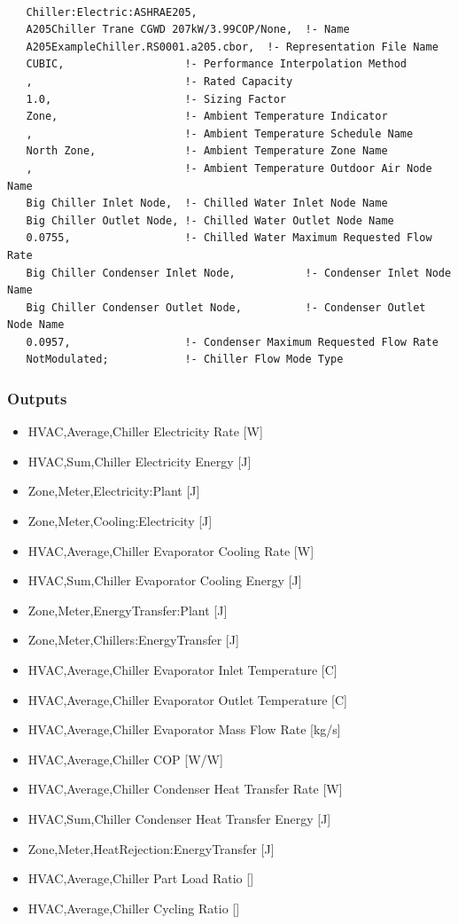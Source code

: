 \begin{lstlisting}

   Chiller:Electric:ASHRAE205,
   A205Chiller Trane CGWD 207kW/3.99COP/None,  !- Name
   A205ExampleChiller.RS0001.a205.cbor,  !- Representation File Name
   CUBIC,                   !- Performance Interpolation Method
   ,                        !- Rated Capacity
   1.0,                     !- Sizing Factor
   Zone,                    !- Ambient Temperature Indicator
   ,                        !- Ambient Temperature Schedule Name
   North Zone,              !- Ambient Temperature Zone Name
   ,                        !- Ambient Temperature Outdoor Air Node Name
   Big Chiller Inlet Node,  !- Chilled Water Inlet Node Name
   Big Chiller Outlet Node, !- Chilled Water Outlet Node Name
   0.0755,                  !- Chilled Water Maximum Requested Flow Rate
   Big Chiller Condenser Inlet Node,           !- Condenser Inlet Node Name
   Big Chiller Condenser Outlet Node,          !- Condenser Outlet Node Name
   0.0957,                  !- Condenser Maximum Requested Flow Rate
   NotModulated;            !- Chiller Flow Mode Type

\end{lstlisting}

\subsubsection{Outputs}

\begin{itemize}
    \item
    HVAC,Average,Chiller Electricity Rate {[}W{]}
    \item
    HVAC,Sum,Chiller Electricity Energy {[}J{]}
    \item
    Zone,Meter,Electricity:Plant {[}J{]}
    \item
    Zone,Meter,Cooling:Electricity {[}J{]}
    \item
    HVAC,Average,Chiller Evaporator Cooling Rate {[}W{]}
    \item
    HVAC,Sum,Chiller Evaporator Cooling Energy {[}J{]}
    \item
    Zone,Meter,EnergyTransfer:Plant {[}J{]}
    \item
    Zone,Meter,Chillers:EnergyTransfer {[}J{]}
    \item
    HVAC,Average,Chiller Evaporator Inlet Temperature {[}C{]}
    \item
    HVAC,Average,Chiller Evaporator Outlet Temperature {[}C{]}
    \item
    HVAC,Average,Chiller Evaporator Mass Flow Rate {[}kg/s{]}
    \item
    HVAC,Average,Chiller COP {[}W/W{]}
    \item
    HVAC,Average,Chiller Condenser Heat Transfer Rate {[}W{]}
    \item
    HVAC,Sum,Chiller Condenser Heat Transfer Energy {[}J{]}
    \item
    Zone,Meter,HeatRejection:EnergyTransfer {[}J{]}
    \item
    HVAC,Average,Chiller Part Load Ratio {[]}
    \item
    HVAC,Average,Chiller Cycling Ratio {[]}
\end{itemize}

